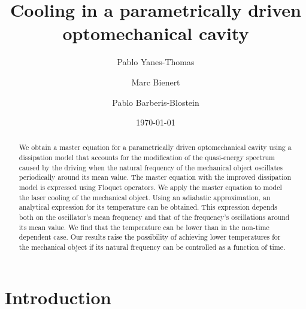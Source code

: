 \documentclass[reprint, amsmath,amssymb, aps,pra]{revtex4-1}
\begin{document}

\title{Cooling in a parametrically driven optomechanical cavity}%

\author{Pablo Yanes-Thomas}

\author{Marc Bienert}

\author{Pablo Barberis-Blostein}

%



\date{\today}

\begin{abstract}

  We obtain a master equation for a parametrically driven
  optomechanical cavity using a dissipation model that accounts for
  the modification of the quasi-energy spectrum caused by the driving
  when the natural frequency of the mechanical object oscillates
  periodically around its mean value. The master equation with the
  improved dissipation model is expressed using Floquet operators. We
  apply the master equation to model the laser cooling of the
  mechanical object. Using an adiabatic approximation, an analytical
  expression for its temperature can be obtained. This expression
  depends both on the oscillator's mean frequency and that of the
  frequency's oscillations around its mean value. We find that the
  temperature can be lower than in the non-time dependent case. Our
  results raise the possibility of achieving lower temperatures for
  the mechanical object if its natural frequency can be controlled as
  a function of time.
\end{abstract}

\maketitle


\section{Introduction}
\end{document}
